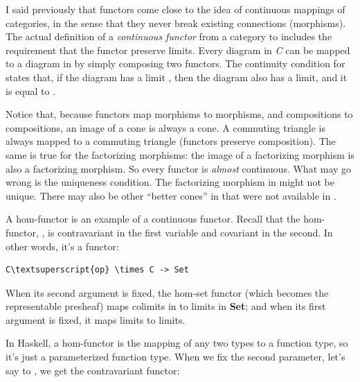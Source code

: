 I said previously that functors come close to the idea of continuous
mappings of categories, in the sense that they never break existing
connections (morphisms). The actual definition of a \emph{continuous
functor}  from a category  to  includes the
requirement that the functor preserve limits. Every diagram 
in \emph{C} can be mapped to a diagram  in  by
simply composing two functors. The continuity condition for 
states that, if the diagram  has a limit , then
the diagram  also has a limit, and it is equal to
.

\begin{figure}[H]
\centering
{}
\end{figure}

\noindent
Notice that, because functors map morphisms to morphisms, and
compositions to compositions, an image of a cone is always a cone. A
commuting triangle is always mapped to a commuting triangle (functors
preserve composition). The same is true for the factorizing morphisms:
the image of a factorizing morphism is also a factorizing morphism. So
every functor is \emph{almost} continuous. What may go wrong is the
uniqueness condition. The factorizing morphism in  might not be
unique. There may also be other ``better cones'' in  that were
not available in .

A hom-functor is an example of a continuous functor. Recall that the
hom-functor, , is contravariant in the first variable
and covariant in the second. In other words, it's a functor:

\begin{Verbatim}[commandchars=\\\{\}]
C\textsuperscript{op} \times C -> Set
\end{Verbatim}
When its second argument is fixed, the hom-set functor (which becomes
the representable presheaf) maps colimits in  to limits in
\textbf{Set}; and when its first argument is fixed, it maps limits to
limits.

In Haskell, a hom-functor is the mapping of any two types to a function
type, so it's just a parameterized function type. When we fix the second
parameter, let's say to , we get the contravariant
functor:

